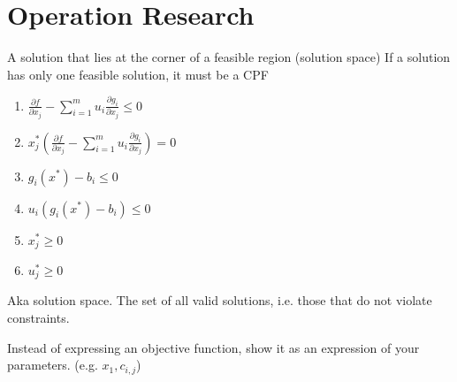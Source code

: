 \section{Operation Research}
\begin{definition}
A solution that lies at the corner of a feasible region (solution space)
If a solution has only one feasible solution, it must be a CPF
\end{definition}

\begin{definition}
\begin{enumerate}
    \item $\frac{\partial{f}}{\partial{x_{j}}} - \sum\limits_{i=1}^{m} u_i
        \frac{\partial{g_i}}{\partial{x_j}} \leq 0 $
    \item $x_j^{*}(\frac{\partial{f}}{\partial{x_{j}}} - \sum\limits_{i=1}^{m} u_i
        \frac{\partial{g_i}}{\partial{x_j}}) = 0 $
    \item $g_i(x^{*}) - b_i \leq 0$
    \item $u_i(g_i(x^{*}) - b_i) \leq 0$
    \item $x_j^{*} \geq 0$
    \item $u_j^{*} \geq 0$
\end{enumerate}
\end{definition}

\begin{definition}
    Aka solution space. The set of all valid solutions, i.e. those that do not
    violate constraints.
\end{definition}

\begin{definition}
    Instead of expressing an objective function, show it as
    an expression of your parameters. (e.g. $x_{1}, c_{i,j}$)
\end{definition}
